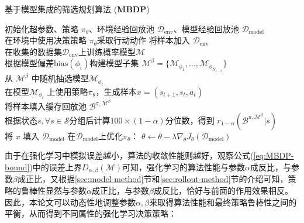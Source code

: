 \begin{algorithm}[t]
\caption{基于模型集成的筛选规划算法 (\textbf{MBDP})}
\label{algo:our-method}
\begin{algorithmic}
\STATE 初始化超参数、策略 $\pi_\theta$、环境经验回放池 $\mathcal{D}_{\mathrm{env}}$、模型经验回放池 $\mathcal{D}_{\mathrm{model}}$\\
    \STATE 在环境中使用决策策略 $\pi_\theta$采取行动动作
    \STATE 将样本加入 $\mathcal{D}_{\mathrm{env}}$\\
        \STATE  在收集的数据集$\mathcal{D}_{\mathrm{env}}$上训练概率模型$\mathcal{M}$\\
        \STATE 根据模型偏差$\mathrm{bias}({\phi_i})$构建模型子集 $\mathcal{M}^\beta = \{\mathcal{M}_{\phi_1},\ldots,\mathcal{M}_{\phi_{N_{1-\beta}}}\}$\\
            \STATE 从 $\mathcal{M}^\beta$ 中随机抽选模型$\mathcal{M}_{\phi_t}$\\
            \STATE 在模型$\mathcal{M}_{\phi_t}$ 上使用策略$\pi_\theta$，生成样本$x=\left(s_{t+1},s_t,a_t\right)$ \\
            \STATE 将样本填入缓存回放池 $\mathcal{B}^{\pi,\mathcal{M}^\beta}$\\
        \ENDFOR
        \STATE 根据状态$s, \forall s\in\mathcal{S}$分组后计算$100\times(1-\alpha)$分位数，得到 $r_{1-\alpha}(\mathcal{B}^{\pi,\mathcal{M}^\beta}|s)$\\
                \STATE 将 $x$ 填入 $\mathcal{D}_{\mathrm{model}}$
            \ENDIF
        \ENDFOR
    \ENDFOR
    \STATE 在$\mathcal{D}_{\mathrm{model}}$上优化$\pi_\theta$： $\theta\leftarrow \theta - \lambda\nabla_\theta J_\theta(\mathcal{D}_{\mathrm{model}})$
\ENDFOR
\end{algorithmic}
\end{algorithm}


由于在强化学习中模拟误差越小，算法的收敛性能则越好，观察公式(\ref{eq:MBDP-bound})中的误差上界$D_{\alpha,\beta}(\mathcal{M})$可知，强化学习的算法性能与参数$\alpha$成反比，与参数$\beta$成正比，又根据\ref{sec:model-method}节和\ref{sec:rollout-method}节的介绍可知，策略的鲁棒性显然与参数$\alpha$成正比，与参数$\beta$成反比，恰好与前面的作用效果相反。因此，本论文可以动态性地调整参数$\alpha,\beta$来取得算法性能和最终策略鲁棒性之间的平衡，从而得到不同属性的强化学习决策策略：

